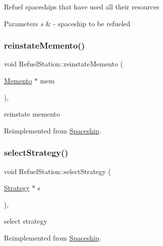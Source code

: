 Refuel spaceships that have used all their resources 
\begin{DoxyParams}{Parameters}
{\em s} & -\/ spaceship to be refueled \\
\hline
\end{DoxyParams}
\mbox{\label{classRefuelStation_aa984ee5ed5a4cea0b96ba1c3903a1b1c}} 
\subsubsection{\texorpdfstring{reinstate\+Memento()}{reinstateMemento()}}
{\footnotesize\ttfamily void Refuel\+Station\+::reinstate\+Memento (\begin{DoxyParamCaption}\item[{\hyperlink{classMemento}{Memento} $\ast$}]{mem }\end{DoxyParamCaption})\hspace{0.3cm}{\ttfamily [inline]}, {\ttfamily [virtual]}}

reinstate memento 

Reimplemented from \hyperlink{classSpaceship_ab075c869473344b6471c8e28ca7ea61e}{Spaceship}.

\mbox{\label{classRefuelStation_a1dfda37915eca25344aa2fdeaacab4b4}} 
\subsubsection{\texorpdfstring{select\+Strategy()}{selectStrategy()}}
{\footnotesize\ttfamily void Refuel\+Station\+::select\+Strategy (\begin{DoxyParamCaption}\item[{\hyperlink{classStrategy}{Strategy} $\ast$}]{s }\end{DoxyParamCaption})\hspace{0.3cm}{\ttfamily [inline]}, {\ttfamily [virtual]}}

select strategy 

Reimplemented from \hyperlink{classSpaceship_a93be2d9d2b675ef978d866d4cd7a6524}{Spaceship}.

\mbox{\label{classRefuelStation_ae87ea232171fbb09e14b2da82ae3af56}} 
